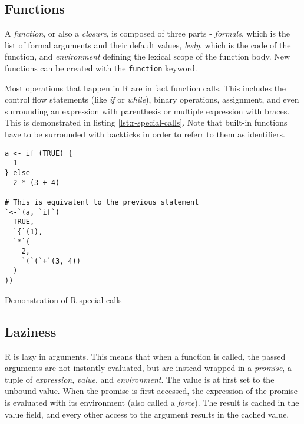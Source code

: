 \subsection*{Functions}

A \textit{function}, or also a \textit{closure}, is composed of three parts - \textit{formals}, which is the list of formal arguments and their default values, \textit{body}, which is the code of the function, and \textit{environment} defining the lexical scope of the function body. New functions can be created with the \texttt{function} keyword.

Most operations that happen in R are in fact function calls. This includes the control flow statements (like \textit{if} or \textit{while}), binary operations, assignment, and even surrounding an expression with parenthesis or multiple expression with braces. This is demonstrated in listing \ref{lst:r-special-calls}. Note that built-in functions have to be surrounded with backticks in order to referr to them as identifiers.

\begin{listing}
	\begin{verbatim}
a <- if (TRUE) {
  1
} else
  2 * (3 + 4)

# This is equivalent to the previous statement
`<-`(a, `if`(
  TRUE,
  `{`(1),
  `*`(
    2,
    `(`(`+`(3, 4))
  )
))
  \end{verbatim}
	\caption{Demonstration of R special calls}\label{lst:r-special-calls}
\end{listing}

\subsection*{Laziness}

R is lazy in arguments. This means that when a function is called, the passed arguments are not instantly evaluated, but are instead wrapped in a \textit{promise}, a tuple of \textit{expression}, \textit{value}, and \textit{environment}. The value is at first set to the unbound value. When the promise is first accessed, the expression of the promise is evaluated with its environment (also called a \textit{force}). The result is cached in the value field, and every other access to the argument results in the cached value.

